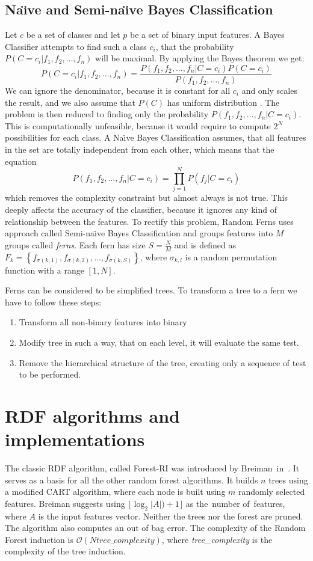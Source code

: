 \documentclass[thesis=B,english]{FITthesis}[2012/10/20]
\begin{document}
	\subsection{Na\"{\i}ve and Semi-na\"{\i}ve Bayes Classification}
	Let \(c\) be a set of classes and let \(p\) be a set of binary input features. A Bayes Classifier attempts to find such a class \(c_i\), that the probability \(P(C=c_i|f_1,f_2,\dots,f_n)\) will be maximal. By applying the Bayes theorem we get: 
	\[
	P(C=c_i|f_1,f_2,\dots,f_n)=\frac{P(f_1,f_2,\dots,f_n|C=c_i)P(C=c_i)}{P(f_1,f_2,\dots,f_n)}
	\] 
	We can ignore the denominator, because it is constant for all \(c_i\) and only scales the result, and we also assume that \(P(C)\) has uniform distribution \cite{ozuysal2010fast}. The problem is then reduced to finding only the probability \(P(f_1,f_2,\dots,f_n|C=c_i)\). This is computationally unfeasible, because it would require to compute \(2^N\) possibilities for each class. A Na\"{\i}ve Bayes Classification assumes, that all features in the set are totally independent from each other, which means that the equation 
	\[
		P(f_1,f_2,\dots,f_n|C=c_i)=\prod_{j=1}^{N} P(f_j|C=c_i)
	\]
	which removes the complexity constraint but almost always is not true. This deeply affects the accuracy of the classifier, because it ignores any kind of relationship between the features. To rectify this problem, Random Ferns uses approach called Semi-na\"{\i}ve Bayes Classification and groups features into \(M\) groups called \emph{ferns}. Each fern has size \(S=\frac{N}{M}\) and is defined as \(F_k=\left\{f_{\sigma(k,1)},f_{\sigma(k,2)}, \dots,f_{\sigma(k,S)}\right\}\), where \(\sigma_{k, l}\) is a random permutation function with a range \([1,N]\).

	Ferns can be considered to be simplified trees. To transform a tree to a fern we have to follow these steps:
	\begin{enumerate}
	\item Transform all non-binary features into binary
	\item Modify tree in such a way, that on each level, it will evaluate the same test.
	\item Remove the hierarchical structure of the tree, creating only a sequence of test to be performed.
	\end{enumerate}



	\section{RDF algorithms and implementations}
	The classic RDF algorithm, called Forest-RI was introduced by Breiman~in~\cite{BR01}. It serves as a basis for all the other random forest algorithms. It builds \(n\) trees using a modified CART algorithm, where each node is built using \(m\) randomly selected features. Breiman suggests using \(\lfloor \log_2|A|)+1\rfloor\) as the~number of~features, where \(A\) is the input features vector. Neither the trees nor the forest are pruned. The algorithm also computes an out of bag error. The complexity of the Random Forest induction is \(\mathcal{O}(N\textit{tree\_complexity})\), where \textit{tree\_complexity} is the complexity of the tree induction.
\end{document}
